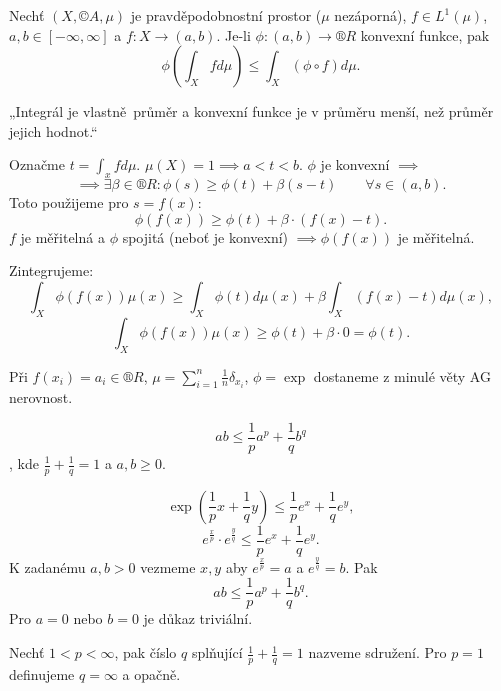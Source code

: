 \documentclass[12pt]{article}					%
\begin{document}
		\begin{veta}
			Nechť $(X, ©A, \mu)$ je pravděpodobnostní prostor ($\mu$ nezáporná), $f \in L^1(\mu)$, $a, b \in [-∞, ∞]$ a $f: X \rightarrow (a, b)$. Je-li $\phi: (a, b) \rightarrow ®R$ konvexní funkce, pak
			$$ \phi(\int_X f d\mu) ≤ \int_X (\phi \circ f) d\mu. $$

			\begin{dukazin}
				„Integrál je vlastně průměr a konvexní funkce je v průměru menší, než průměr jejich hodnot.“
				
				Označme $t = \int_x f d\mu$. $\mu(X) = 1 \implies a < t < b$. $\phi$ je konvexní $\implies$
				$$ \implies \exists \beta \in ®R: \phi(s) ≥ \phi(t) + \beta(s - t)\qquad \forall s \in (a, b). $$
				Toto použijeme pro $s = f(x)$:
				$$ \phi(f(x)) ≥ \phi(t) + \beta·(f(x) - t). $$
				$f$ je měřitelná a $\phi$ spojitá (neboť je konvexní) $\implies \phi(f(x))$ je měřitelná.

				Zintegrujeme:
				$$ \int_X \phi(f(x)) \mu(x) ≥ \int_X \phi(t) d\mu(x) + \beta \int_X(f(x) - t) d\mu(x), $$
				$$ \int_X \phi(f(x)) \mu(x) ≥ \phi(t) + \beta·0 = \phi(t). $$
			\end{dukazin}
		\end{veta}

		\begin{priklad}
			Při $f(x_i) = a_i \in ®R$, $\mu = \sum_{i=1}^n \frac{1}{n} \delta_{x_i}$, $\phi = \exp$ dostaneme z minulé věty AG nerovnost.
		\end{priklad}

		\begin{priklad}
			$$ ab ≤ \frac{1}{p}a^p + \frac{1}{q}b^q $$, kde $\frac{1}{p} + \frac{1}{q} = 1$ a $a, b ≥ 0$.

			\begin{reseni}
				$$ \exp(\frac{1}{p}x + \frac{1}{q}y) ≤ \frac{1}{p}e^x + \frac{1}{q}e^y, $$
				$$ e^{\frac{x}{p}}·e^{\frac{y}{q}} ≤ \frac{1}{p}e^x + \frac{1}{q}e^y. $$
				K zadanému $a, b > 0$ vezmeme $x, y$ aby $e^{\frac{x}{p}} = a$ a $e^{\frac{y}{q}} = b$. Pak
				$$ ab ≤ \frac{1}{p} a^p + \frac{1}{q} b^q. $$
				Pro $a = 0$ nebo $b = 0$ je důkaz triviální.
			\end{reseni}
		\end{priklad}

		\begin{definice}
			Nechť $1 < p < ∞$, pak číslo $q$ splňující $\frac{1}{p} + \frac{1}{q} = 1$ nazveme sdružení. Pro $p = 1$ definujeme $q = ∞$ a opačně.
		\end{definice}
\end{document}

